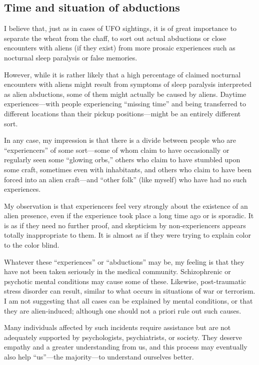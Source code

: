 \subsection{Time and situation of abductions}

I believe that, just as in cases of UFO sightings, it is of great importance to separate the wheat from the chaff,
to sort out actual abductions or close encounters with aliens (if they exist)
from more prosaic experiences such as nocturnal sleep paralysis or false memories.

However, while it is rather likely that a high percentage of claimed nocturnal encounters with aliens might result from
symptoms of sleep paralysis interpreted as alien abductions, some of them might actually be caused by aliens.
Daytime experiences---with people experiencing ``missing time'' and being transferred to different locations than their pickup positions---might
be an entirely different sort.

In any case, my impression is that there is a divide between people who are ``experiencers'' of some sort---some of whom claim to have occasionally
or regularly seen some ``glowing orbs,'' others who claim to have stumbled upon some craft, sometimes even with inhabitants, and others who claim to have
been forced into an alien craft---and ``other folk'' (like myself) who have had no such experiences.

My observation is that experiencers feel very strongly about the existence of an alien presence, even if the experience took place a long time ago or is sporadic.
It is as if they need no further proof, and skepticism by non-experiencers appears totally inappropriate to them.
It is almost as if they were trying to explain color to the color blind.

Whatever these ``experiences'' or ``abductions'' may be, my feeling is that they have not been taken seriously in the medical community.
Schizophrenic or psychotic mental conditions may cause some of these.
Likewise, post-traumatic stress disorder can result, similar to what occurs in situations of war or terrorism.
I am not suggesting that all cases can be explained by mental conditions, or that they are alien-induced; although one should not a priori rule out such causes.

Many individuals affected by such incidents require assistance but are not adequately supported by psychologists, psychiatrists, or society. They deserve empathy and a greater understanding from us,
and this process may eventually also help ``us''---the majority---to understand ourselves better.

